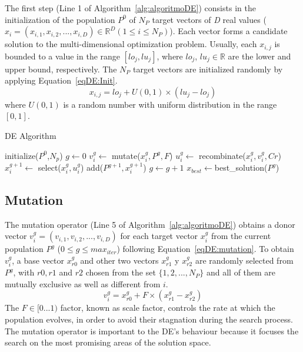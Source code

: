 The first step (Line 1 of Algorithm~\ref{alg:algoritmoDE}) consists in the initialization of the population $P^0$ of $N_P$ target vectors of \textit{D} real values ($x_i = (x_{i,1}, x_{i,2}, . . . , x_{i,D}) \in \mathbb{R}^{D}  (1 \leq i \leq N_P)$). Each vector forms a candidate solution to the multi-dimensional optimization problem. Usually, each $x_{i,j}$ is bounded to a value in the range $[lo_j, lu_j]$, where $lo_j$, $lu_j \in \mathbb{R}$ are the lower and upper bound, respectively. The $N_P$ target vectors are initialized randomly by applying Equation~\ref{eqDE:Init}.
\vspace{-0.2cm}
\begin{equation}\label{eqDE:Init}
x_{i,j} = lo_{j} + U(0, 1) \times (lu_j - lo_j)
\end{equation}
\noindent where $U(0, 1)$ is a random number with uniform distribution in the range $[0, 1]$. 

\begin{algorithm}[tb]
\scriptsize
    \caption{DE Algorithm } \label{alg:algoritmoDE}
    \begin{algorithmic} [1]
        \State initialize($P^0$,$N_p$) 
        \State $g \leftarrow 0$
                \State $v_{i}^g \leftarrow $ mutate($x_{i}^g, P^g, F$) 
                \State $u_{i}^g \leftarrow $ recombinate($x_{i}^g, v_{i}^g, Cr$)
                \State $x_{i}^{g+1} \leftarrow $ select($x_{i}^g, u_{i}^g$)
                \State add($P^{g+1}, x_{i}^{g+1}$) 
            \EndFor
            \State $g \leftarrow g+1$ 
        \EndWhile
        \State$x_{best} \leftarrow $best\_solution($P^{g}$)
    \end{algorithmic}
\end{algorithm}


\subsection{Mutation}
The mutation operator (Line 5 of Algorithm~\ref{alg:algoritmoDE}) obtains a donor vector $v_i^g = (v_{i,1}, v_{i,2}, . . . , v_{i,D})$ for each target vector $x_i^g$ from the current population $P^g$ ($0 \leq g \leq max_{iter}$) following Equation~\ref{eqDE:mutation}. To obtain $v_i^g$, a base vector $x_{r0}^g$ and other two vectors $x_{r1}^g$ y $x_{r2}^g$ are randomly selected from $P^g$, with $r0, r1$ and $r2$ chosen from the set $\{1,2,...,N_P\}$ and all of them are mutually exclusive as well as different from $i$. 
\vspace{-0.1cm}
\begin{equation}\label{eqDE:mutation} 
v_i^g = x_{r0}^g + F \times (x_{r1}^g - x_{r2}^g)
\end{equation}
The $F \in [0 . . . 1)$ factor, known as scale factor, controls the rate at which the population evolves, in order to avoid their stagnation during the search process. The mutation operator is important to the DE's behaviour because it focuses the search on the most promising areas of the solution space. 

